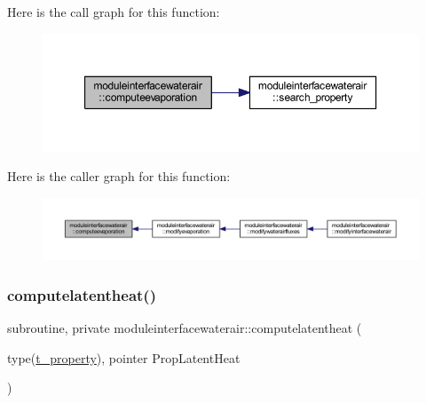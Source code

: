Here is the call graph for this function\+:\nopagebreak
\begin{figure}[H]
\begin{center}
\leavevmode
\includegraphics[width=350pt]{namespacemoduleinterfacewaterair_a808beb15bad5f77afa64f469679f1229_cgraph}
\end{center}
\end{figure}
Here is the caller graph for this function\+:\nopagebreak
\begin{figure}[H]
\begin{center}
\leavevmode
\includegraphics[width=350pt]{namespacemoduleinterfacewaterair_a808beb15bad5f77afa64f469679f1229_icgraph}
\end{center}
\end{figure}
\mbox{\label{namespacemoduleinterfacewaterair_a5442677ffd4780b9f170ffed821b8185}} 
\subsubsection{\texorpdfstring{computelatentheat()}{computelatentheat()}}
{\footnotesize\ttfamily subroutine, private moduleinterfacewaterair\+::computelatentheat (\begin{DoxyParamCaption}\item[{type(\mbox{\hyperlink{structmoduleinterfacewaterair_1_1t__property}{t\+\_\+property}}), pointer}]{Prop\+Latent\+Heat }\end{DoxyParamCaption})\hspace{0.3cm}{\ttfamily [private]}}

